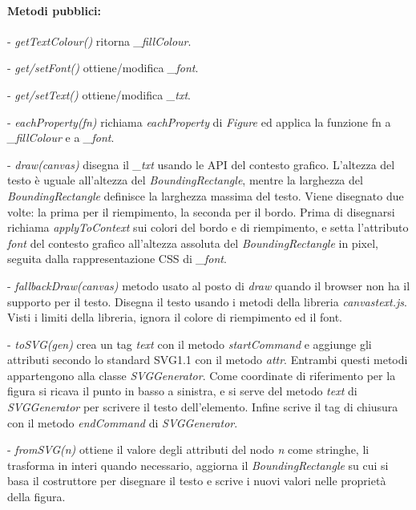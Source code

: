 \paragraph{Metodi pubblici:}
\begin{elencopuntato}[\subsubsecindent]
\item[-] \textit{getTextColour()} ritorna \textit{{\_}fillColour}.
\item[-] \textit{get/setFont()} ottiene/modifica \textit{{\_}font}.
\item[-] \textit{get/setText()} ottiene/modifica \textit{{\_}txt}.
\item[-] \textit{eachProperty(fn)} richiama \textit{eachProperty} di \textit{Figure} ed applica la funzione fn a \textit{{\_}fillColour} e a \textit{{\_}font}.
\item[-] \textit{draw(canvas)} disegna il \textit{{\_}txt} usando le API del contesto grafico. L'altezza del testo \`e uguale all'altezza del \textit{BoundingRectangle}, mentre la larghezza del \textit{BoundingRectangle} definisce la larghezza massima del testo. Viene disegnato due volte: la prima per il riempimento, la seconda per il bordo. Prima di disegnarsi richiama \textit{applyToContext} sui colori del bordo e di riempimento, e setta l'attributo \textit{font} del contesto grafico all'altezza assoluta del \textit{BoundingRectangle} in pixel, seguita dalla rappresentazione CSS di \textit{{\_}font}.
\item[-] \textit{fallbackDraw(canvas)} metodo usato al posto di \textit{draw} quando il browser non ha il supporto per il testo. Disegna il testo usando i metodi della libreria \textit{canvastext.js}. Visti i limiti della libreria, ignora il colore di riempimento ed il font.
\item[-] \textit{toSVG(gen)} crea un tag \textit{text} con il metodo \textit{startCommand} e aggiunge gli attributi secondo lo standard SVG1.1 con il metodo \textit{attr}. Entrambi questi metodi appartengono alla classe \textit{SVGGenerator}. Come coordinate di riferimento per la figura si ricava il punto in basso a sinistra, e si serve del metodo \textit{text} di \textit{SVGGenerator} per scrivere il testo dell'elemento. Infine scrive il tag di chiusura con il metodo \textit{endCommand} di \textit{SVGGenerator}.
\item[-] \textit{fromSVG(n)} ottiene il valore degli attributi del nodo \textit{n} come stringhe, li trasforma in interi quando necessario, aggiorna il \textit{BoundingRectangle} su cui si basa il costruttore per disegnare il testo e scrive i nuovi valori nelle propriet\`a della figura.  
\end{elencopuntato}



